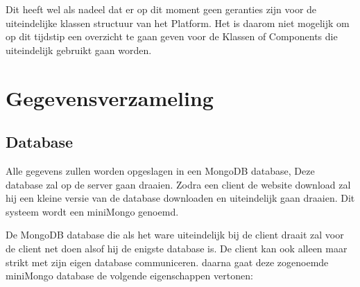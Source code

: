 \documentclass[]{report}
\begin{document}
Dit heeft wel als nadeel dat er op dit moment geen geranties zijn voor de uiteindelijke klassen structuur van het Platform. Het is daarom niet mogelijk om op dit tijdstip een overzicht te gaan geven voor de Klassen of Components die uiteindelijk gebruikt gaan worden.


\chapter{Gegevensverzameling}


\section{Database}
Alle gegevens zullen worden opgeslagen in een MongoDB database, Deze database zal op de server gaan draaien. Zodra een client de website download zal hij een kleine versie van de database downloaden en uiteindelijk gaan draaien. Dit systeem wordt een miniMongo genoemd.

De MongoDB database die als het ware uiteindelijk bij de client draait zal voor de client net doen alsof hij de enigste database is. De client kan ook alleen maar strikt met zijn eigen database communiceren. daarna gaat deze zogenoemde miniMongo database de volgende eigenschappen vertonen:
\end{document}
